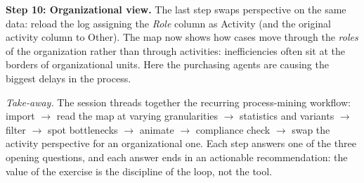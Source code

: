 \textbf{Step 10: Organizational view.} The last step swaps perspective on the same data: reload the log assigning the \emph{Role} column as Activity (and the original activity column to Other). The map now shows how cases move through the \emph{roles} of the organization rather than through activities: inefficiencies often sit at the borders of organizational units. Here the purchasing agents are causing the biggest delays in the process.

\medskip
\noindent\emph{Take-away.} The session threads together the recurring process-mining workflow: import $\to$ read the map at varying granularities $\to$ statistics and variants $\to$ filter $\to$ spot bottlenecks $\to$ animate $\to$ compliance check $\to$ swap the activity perspective for an organizational one. Each step answers one of the three opening questions, and each answer ends in an actionable recommendation: the value of the exercise is the discipline of the loop, not the tool.
